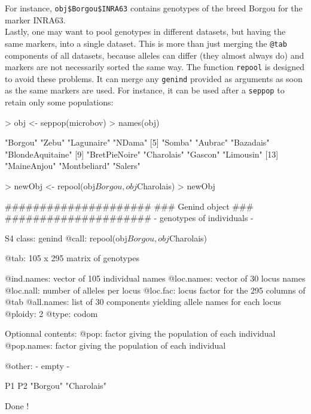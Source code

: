 \documentclass{article}
\begin{document}
For instance, \texttt{obj\$Borgou\$INRA63} contains genotypes of the
breed Borgou for the marker INRA63.
\\

Lastly, one may want to pool genotypes in different datasets, but having
the same markers, into a single dataset.
This is more than just merging the \texttt{@tab} components of all
datasets, because alleles can differ (they almost always do) and
markers are not necessarily sorted the same way.
The function \texttt{repool} is designed to avoid these problems.
It can merge any \texttt{genind} provided as arguments as soon as the
same markers are used.
For instance, it can be used after a \texttt{seppop} to retain only some populations:
\begin{Schunk}
\begin{Sinput}
> obj <- seppop(microbov)
> names(obj)
\end{Sinput}
\begin{Soutput}
 [1] "Borgou"          "Zebu"            "Lagunaire"       "NDama"          
 [5] "Somba"           "Aubrac"          "Bazadais"        "BlondeAquitaine"
 [9] "BretPieNoire"    "Charolais"       "Gascon"          "Limousin"       
[13] "MaineAnjou"      "Montbeliard"     "Salers"         
\end{Soutput}
\begin{Sinput}
> newObj <- repool(obj$Borgou, obj$Charolais)
> newObj
\end{Sinput}
\begin{Soutput}
   #####################
   ### Genind object ### 
   #####################
- genotypes of individuals - 

S4 class:  genind
@call: repool(obj$Borgou, obj$Charolais)

@tab:  105 x 295 matrix of genotypes

@ind.names: vector of  105 individual names
@loc.names: vector of  30 locus names
@loc.nall: number of alleles per locus
@loc.fac: locus factor for the  295 columns of @tab
@all.names: list of  30 components yielding allele names for each locus
@ploidy:  2
@type:  codom

Optionnal contents: 
@pop:  factor giving the population of each individual
@pop.names:  factor giving the population of each individual

@other: - empty -
\end{Soutput}
\begin{Soutput}
         P1          P2 
   "Borgou" "Charolais" 
\end{Soutput}
\end{Schunk}
Done !
\end{document}
